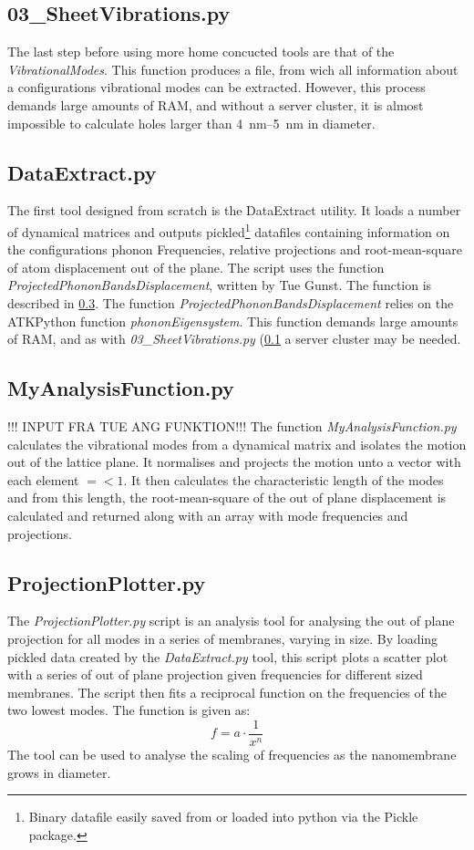 \subsection{03\_SheetVibrations.py}\label{03}
The last step before using more home concucted tools are that of the \textit{VibrationalModes}. This function produces a file, from wich all information about a configurations vibrational modes can be extracted. However, this process demands large amounts of RAM, and without a server cluster, it is almost impossible to calculate holes larger than \SIrange{4}{5}{\nm} in diameter.
\subsection{DataExtract.py}\label{DE}
The first tool designed from scratch is the DataExtract utility. It loads a number of dynamical matrices and outputs pickled\footnote{Binary datafile easily saved from or loaded into python via the Pickle package.} datafiles containing information on the configurations phonon Frequencies, relative projections and root-mean-square of atom displacement out of the plane. The script uses the function \textit{ProjectedPhononBandsDisplacement}, written by Tue Gunst. The function is described in \cref{MAF}.
The function \textit{ProjectedPhononBandsDisplacement} relies on the ATKPython function \textit{phononEigensystem}. This function demands large amounts of RAM, and as with \textit{03\_SheetVibrations.py} (\cref{03} a server cluster may be needed.
\subsection{MyAnalysisFunction.py}\label{MAF}
!!! INPUT FRA TUE ANG FUNKTION!!!
The function \textit{MyAnalysisFunction.py} calculates the vibrational modes from a dynamical matrix and isolates the motion out of the lattice plane. It normalises and projects the motion unto a vector with each element $=< 1$. It then calculates the characteristic length of the modes and from this length, the root-mean-square of the out of plane displacement is calculated and returned along with an array with mode frequencies and projections.
\subsection{ProjectionPlotter.py}
The \textit{ProjectionPlotter.py} script is an analysis tool for analysing the out of plane projection for all modes in a series of membranes, varying in size. By loading pickled data created by the \textit{DataExtract.py} tool, this script plots a scatter plot with a series of out of plane projection given frequencies for different sized membranes. The script then fits a reciprocal function on the frequencies of the two lowest modes.
The function is given as:
\begin{equation}
  f = a \cdot \frac{1}{x^n}
\end{equation}
The tool can be used to analyse the scaling of frequencies as the nanomembrane grows in diameter.
